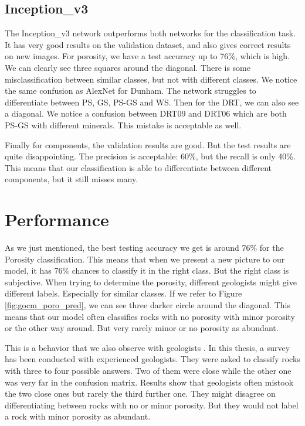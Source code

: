 \subsection{Inception\_v3}
The Inception\_v3 network outperforms both networks for the classification task. It has very good results on the validation dataset, and also gives correct results on new images. For porosity, we have a test accuracy up to 76\%, which is high. We can clearly see three squares around the diagonal. There is some misclassification between similar classes, but not with different classes. 
We notice the same confusion as AlexNet for Dunham. The network struggles to differentiate between PS, GS, PS-GS and WS. 
Then for the DRT, we can also see a diagonal. We notice a confusion between DRT09 and DRT06 which are both PS-GS with different minerals. This mistake is acceptable as well.

Finally for components, the validation results are good. But the test results are quite disappointing. The precision is acceptable: 60\%, but the recall is only 40\%. This means that our classification is able to differentiate between different components, but it still misses many.

\section{Performance} \label{sec:perf}

As we just mentioned, the best testing accuracy we get is around 76\% for the Porosity classification. This means that when we present a new picture to our model, it has 76\% chances to classify it in the right class. But the right class is subjective. When trying to determine the porosity, different geologists might give different labels. Especially for similar classes. If we refer to Figure \ref{fig:gocm_poro_pred}, we can see three darker circle around the diagonal. This means that our model often classifies rocks with no porosity with minor porosity or the other way around. But very rarely minor or no porosity as abundant.

This is a behavior that we also observe with geologists \cite{thesis_imperial}. In this thesis, a survey has been conducted with experienced geologists. They were asked to classify rocks with three to four possible answers. Two of them were close while the other one was very far in the confusion matrix. Results show that geologists often mistook the two close ones but rarely the third further one. 
They might disagree on differentiating between rocks with no or minor porosity. But they would not label a rock with minor porosity as abundant. 

